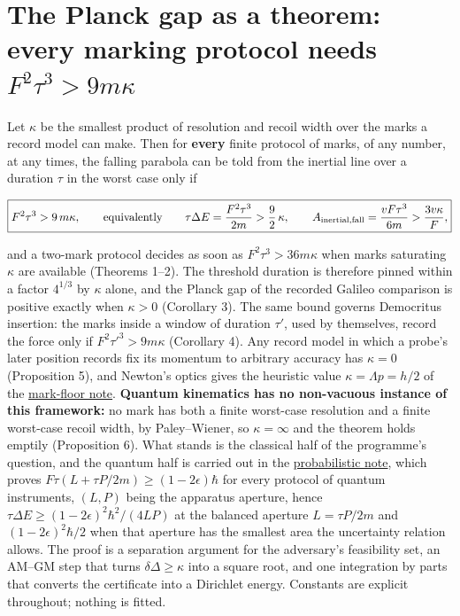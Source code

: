 \documentclass[11pt,a4paper]{article}
\begin{document}
\hypertarget{the-planck-gap-as-a-theorem-every-marking-protocol-needs-f2tau39mkappa}{%
\section{\texorpdfstring{The Planck gap as a theorem: every marking
protocol needs
\(F^2\tau^3>9m\kappa\)}{The Planck gap as a theorem: every marking protocol needs F\^{}2\textbackslash tau\^{}3\textgreater9m\textbackslash kappa}}\label{the-planck-gap-as-a-theorem-every-marking-protocol-needs-f2tau39mkappa}}

Let \(\kappa\) be the smallest product of resolution and recoil width
over the marks a record model can make. Then for \textbf{every} finite
protocol of marks, of any number, at any times, the falling parabola can
be told from the inertial line over a duration \(\tau\) in the worst
case only if

\[\boxed{F^2\tau^3>9\,m\kappa,\qquad\text{equivalently}\qquad
\tau\Delta E=\frac{F^2\tau^3}{2m}>\frac92\,\kappa,\qquad
A_{\rm inertial,fall}=\frac{vF\tau^3}{6m}>\frac{3v\kappa}{F},}\]

and a two-mark protocol decides as soon as \(F^2\tau^3>36m\kappa\) when
marks saturating \(\kappa\) are available (Theorems 1--2). The threshold
duration is therefore pinned within a factor \(4^{1/3}\) by \(\kappa\)
alone, and the Planck gap of the recorded Galileo comparison is positive
exactly when \(\kappa>0\) (Corollary 3). The same bound governs
Democritus insertion: the marks inside a window of duration \(\tau'\),
used by themselves, record the force only if \(F^2\tau'^3>9m\kappa\)
(Corollary 4). Any record model in which a probe's later position
records fix its momentum to arbitrary accuracy has \(\kappa=0\)
(Proposition 5), and Newton's optics gives the heuristic value
\(\kappa=\Lambda p=h/2\) of the \href{newton-mark-floor.md}{mark-floor
note}. \textbf{Quantum kinematics has no non-vacuous instance of this
framework:} no mark has both a finite worst-case resolution and a finite
worst-case recoil width, by Paley--Wiener, so \(\kappa=\infty\) and the
theorem holds emptily (Proposition 6). What stands is the classical half
of the programme's question, and the quantum half is carried out in the
\href{planck-gap-probabilistic.md}{probabilistic note}, which proves
\(F\tau(L+\tau P/2m)\ge(1-2\epsilon)\hbar\) for every protocol of
quantum instruments, \((L,P)\) being the apparatus aperture, hence
\(\tau\Delta E\ge(1-2\epsilon)^2\hbar^2/(4LP)\) at the balanced aperture
\(L=\tau P/2m\) and \((1-2\epsilon)^2\hbar/2\) when that aperture has
the smallest area the uncertainty relation allows. The proof is a
separation argument for the adversary's feasibility set, an AM--GM step
that turns \(\delta\Delta\ge\kappa\) into a square root, and one
integration by parts that converts the certificate into a Dirichlet
energy. Constants are explicit throughout; nothing is fitted.
\end{document}
